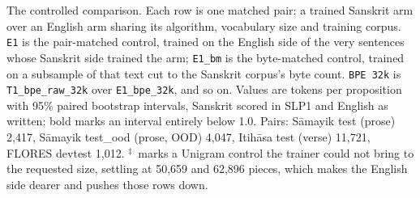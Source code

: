 \begin{table}[t]
\caption{The controlled comparison. Each row is one matched pair: a trained Sanskrit arm over an English arm sharing its algorithm, vocabulary size and training corpus. \texttt{E1} is the pair-matched control, trained on the English side of the very sentences whose Sanskrit side trained the arm; \texttt{E1\_bm} is the byte-matched control, trained on a subsample of that text cut to the Sanskrit corpus's byte count. \texttt{BPE 32k} is \texttt{T1\_bpe\_raw\_32k} over \texttt{E1\_bpe\_32k}, and so on. Values are tokens per proposition with 95\% paired bootstrap intervals, Sanskrit scored in SLP1 and English as written; bold marks an interval entirely below 1.0. Pairs: S\=amayik test (prose) 2,417, S\=amayik test\_ood (prose, OOD) 4,047, Itih\=asa test (verse) 11,721, FLORES devtest 1,012. $^{\ddagger}$~marks a Unigram control the trainer could not bring to the requested size, settling at 50,659 and 62,896 pieces, which makes the English side dearer and pushes those rows down.}
\label{tab:tppcontrolled}
\end{table}
